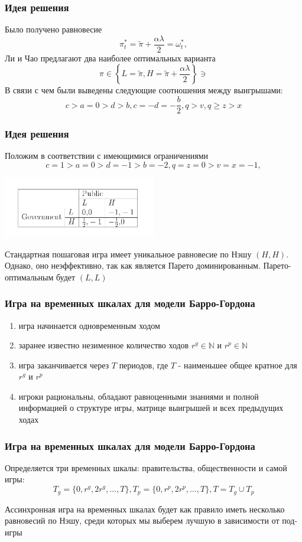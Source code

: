 \documentclass {beamer}
\begin{document}
\begin{frame}
\frametitle{Идея решения}
Было получено равновесие 
$$ \pi^*_t= \tilde{\pi} + \frac{\alpha\lambda}{2}= \omega^*_t,$$ 
Ли и Чао предлагают два наиболее оптимальных варианта 
$$\pi \in \left\{L=\tilde{\pi}, H=\tilde{\pi}+\frac{\alpha\lambda}{2} \right\} \ni $$
В связи с чем были выведены следующие соотношения между выигрышами:
\begin{equation}
\label{eq:sec:ot:constraint}
c>a=0 > d > b,c=-d=-\frac{b}{2}, q>v,q\ge z>x
\end{equation}
\end{frame}

\begin{frame}
\frametitle{Идея решения}
Положим в соответствии с имеющимися ограничениями
$$c=1 > a=0 > d=-1 > b=-2, q=z=0 > v=x=-1,$$
  \begin{center}
  	\includegraphics[width=0.5\textwidth]{second}
  \end{center}
  
  Стандартная пошаговая игра имеет уникальное равновесие по Нэшу $(H,H)$. Однако, оно неэффективно, так как является Парето доминированным.
  Парето-оптимальным будет  $(L,L)$
\end{frame}


\begin{frame}
\frametitle{Игра на временных шкалах для модели Барро-Гордона}
\begin{enumerate}
\item
 игра начинается одновременным ходом
 \item
 заранее известно незименное количество ходов $r^g \in \mathbb{N}$ и $r^p \in \mathbb{N}$
 \item игра заканчивается через $T$ периодов, где $T$ - наименьшее общее кратное для $r^g$ и $r^p$
 \item
 игроки рациональны, обладают равноценными знаниями и полной информацией о структуре игры, матрице выигрышей и всех предыдущих ходах
\end{enumerate}
\end{frame}

\begin{frame}
	\frametitle{Игра на временных шкалах для модели Барро-Гордона}
	Определяется три временных шкалы: правительства, общественности и самой игры:
	\begin{equation}
	\label{eq:sec:tech:scales}
	T_g = \{0,r^g,2r^g,...,T\}, T_p=\{0,r^p,2r^p,...,T\}, T=T_g\cup T_p 
	\end{equation}
	
	Ассинхронная игра на временных шкалах будет как правило иметь несколько равновесий по Нэшу, среди которых мы выберем лучшую в зависимости от под-игры
\end{frame}
\end{document}
